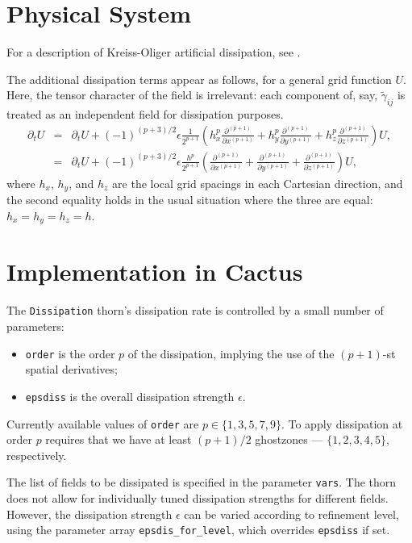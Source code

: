 \section{Physical System}
For a description of Kreiss-Oliger artificial dissipation, see \cite{kreiss-oliger}.

The additional dissipation terms appear as follows, for a general grid function $U$. Here, the
tensor character of the field is irrelevant: each component of, say, $\tilde{\gamma}_{ij}$ is
treated as an independent field for dissipation purposes.
%
\begin{eqnarray*}
\partial_t U &=& \partial_t U + (-1)^{(p+3)/2} \epsilon \frac{1}{2^{p+1}} \left( h_x^{p} \frac{\partial^{(p+1)}}{\partial x^{(p+1)}} + h_y^{p} \frac{\partial^{(p+1)}}{\partial y^{(p+1)}} +
h_z^{p} \frac{\partial^{(p+1)}}{\partial z^{(p+1)}}\right) U, \\
             &=& \partial_t U + (-1)^{(p+3)/2} \epsilon \frac{h^{p}}{2^{p+1}} \left( \frac{\partial^{(p+1)}}{\partial x^{(p+1)}} + \frac{\partial^{(p+1)}}{\partial y^{(p+1)}} +
\frac{\partial^{(p+1)}}{\partial z^{(p+1)}}\right) U,
\end{eqnarray*}
%
where $h_x$, $h_y$, and $h_z$ are the local grid spacings in each Cartesian direction, and the
second equality holds in the usual situation where the three are equal: $h_x = h_y = h_z = h$.

\section{Implementation in Cactus}

The \texttt{Dissipation} thorn's dissipation rate is controlled by a small number of parameters:
%
\begin{itemize}
  \item \texttt{order} is the order $p$ of the dissipation, implying the use of the $(p+1)$-st spatial derivatives;
  \item \texttt{epsdiss} is the overall dissipation strength $\epsilon$.
\end{itemize}

Currently available values of \texttt{order} are $p \in \{1, 3, 5, 7, 9\}$. To apply dissipation at
order $p$ requires that we have at least $(p+1)/2$ ghostzones --- $\{1, 2, 3, 4, 5\}$, respectively.

The list of fields to be dissipated is specified in the parameter \texttt{vars}. The thorn does
not allow for individually tuned dissipation strengths for different fields. However, the
dissipation strength $\epsilon$ can be varied according to refinement level, using the parameter
array \texttt{epsdis\_for\_level}, which overrides \texttt{epsdiss} if set.

